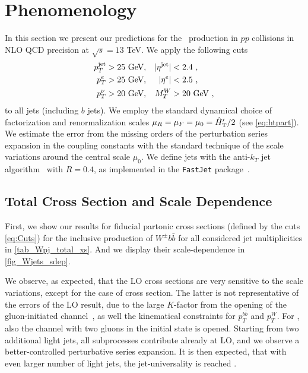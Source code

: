 \section{Phenomenology}
\label{sec:wbb:pheno}
In this section we present our predictions for the \Wbbn~production in
$pp$ collisions in NLO QCD precision at $\sqrt{s}=13$ TeV. 
We apply the following cuts
\begin{align}
  p_T^{\text{jet}}&>25\text{ GeV},& |\eta^{\text{jet}}|&<2.4\ ,\notag\\
  p_T^{e}&>25\text{ GeV},& |\eta^{e}|&<2.5\ ,\notag\\
  p_T^{\nu}&>20\text{ GeV},& M_T^W &> 20\text{ GeV}\ ,
  \label{eq:Cuts}
\end{align}
to all jets (including $b$ jets).
We employ the standard dynamical choice of factorization and renormalization scales $\mu_R=\mu_F=\mu_0={\hat H}_{\mathrm T}'/2$ (see \cref{eq:htpart}).
We estimate the error from the missing orders of the perturbation series expansion in the coupling constants with the standard technique of
the scale variations around the central scale $\mu_0$. 
We define jets with the anti-$k_T$ jet algorithm~\cite{antikT} with $R=0.4$, as implemented in the
\texttt{FastJet} package~\cite{Cacciari:2011ma}.

\subsection{Total Cross Section and Scale Dependence}
\label{totalxsw}
First, we show our results for fiducial partonic cross sections (defined by the cuts \cref{eq:Cuts})
for the inclusive production of $W^{\pm}b\bar{b}$ for all considered jet multiplicities in \cref{tab_Wpj_total_xs}.
And we display their scale-dependence in \cref{fig_Wjets_sdep}.

We observe, as expected, that the LO cross sections are very sensitive to the scale variations,
except for the case of \Wbb{} cross section.
The latter is not representative of the errors of the LO result, due
to the large $K$-factor from the opening of the gluon-initiated channel~\cite{Ellis:1998fv,FebresCordero:2006sj,Cordero:2009kv},
as well the kinematical constraints for $p_T^{b\bar b}$ and $p_T^W$.
For \Wbbj{}, also the channel with two gluons in the initial state is opened.
Starting from two additional light jets, all subprocesses contribute already at LO,
and we observe a better-controlled perturbative series expansion.
It is then expected, that with even larger number of light jets,
the jet-universality is reached \cite{BH:Wratios,BH:W5j}.


